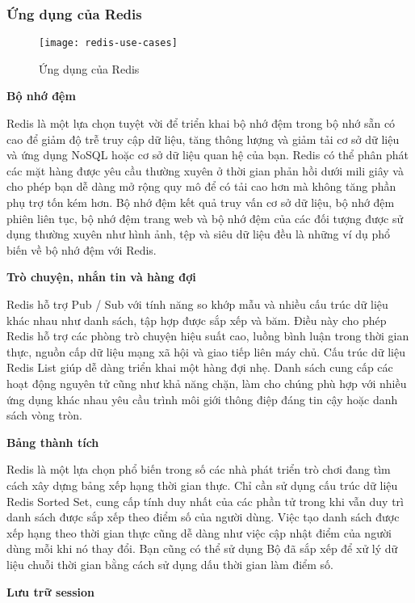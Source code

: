 \subsubsection{Ứng dụng của Redis}

\begin{figure}[ht]
	\centering
	\texttt{[image: redis-use-cases]}
	\caption{Ứng dụng của Redis}
\end{figure}

\textbf{Bộ nhớ đệm}

Redis là một lựa chọn tuyệt vời để triển khai bộ nhớ đệm trong bộ nhớ sẵn có cao để giảm độ trễ truy cập dữ liệu, tăng thông lượng và giảm tải cơ sở dữ liệu và ứng dụng NoSQL hoặc cơ sở dữ liệu quan hệ của bạn. Redis có thể phân phát các mặt hàng được yêu cầu thường xuyên ở thời gian phản hồi dưới mili giây và cho phép bạn dễ dàng mở rộng quy mô để có tải cao hơn mà không tăng phần phụ trợ tốn kém hơn. Bộ nhớ đệm kết quả truy vấn cơ sở dữ liệu, bộ nhớ đệm phiên liên tục, bộ nhớ đệm trang web và bộ nhớ đệm của các đối tượng được sử dụng thường xuyên như hình ảnh, tệp và siêu dữ liệu đều là những ví dụ phổ biến về bộ nhớ đệm với Redis.

\textbf{Trò chuyện, nhắn tin và hàng đợi}

Redis hỗ trợ Pub / Sub với tính năng so khớp mẫu và nhiều cấu trúc dữ liệu khác nhau như danh sách, tập hợp được sắp xếp và băm. Điều này cho phép Redis hỗ trợ các phòng trò chuyện hiệu suất cao, luồng bình luận trong thời gian thực, nguồn cấp dữ liệu mạng xã hội và giao tiếp liên máy chủ. Cấu trúc dữ liệu Redis List giúp dễ dàng triển khai một hàng đợi nhẹ. Danh sách cung cấp các hoạt động nguyên tử cũng như khả năng chặn, làm cho chúng phù hợp với nhiều ứng dụng khác nhau yêu cầu trình môi giới thông điệp đáng tin cậy hoặc danh sách vòng tròn.

\textbf{Bảng thành tích}

Redis là một lựa chọn phổ biến trong số các nhà phát triển trò chơi đang tìm cách xây dựng bảng xếp hạng thời gian thực. Chỉ cần sử dụng cấu trúc dữ liệu Redis Sorted Set, cung cấp tính duy nhất của các phần tử trong khi vẫn duy trì danh sách được sắp xếp theo điểm số của người dùng. Việc tạo danh sách được xếp hạng theo thời gian thực cũng dễ dàng như việc cập nhật điểm của người dùng mỗi khi nó thay đổi. Bạn cũng có thể sử dụng Bộ đã sắp xếp để xử lý dữ liệu chuỗi thời gian bằng cách sử dụng dấu thời gian làm điểm số.

\textbf{Lưu trữ session}

